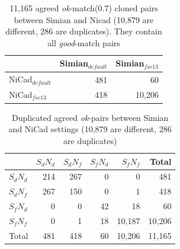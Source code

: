 \documentclass{IEEEtran}
\begin{document}
\begin{table}[H]
	\centering
	\caption{11,165 agreed \textit{ok}-match(0.7) cloned pairs between Simian and Nicad (10,879 are different, 286 are duplicates). They contain all \textit{good}-match pairs}
	\label{t_agreed_ok_clone_pairs}
	\begin{tabular}{l|r|r}
		\hline
		& Simian$_{\mathrm{\textit{default}}}$ & Simian$_{\mathrm{\textit{fse13}}}$ \\ %
		\hline
		NiCad$_{\mathrm{\textit{default}}}$ & 481 & 60 \\%
		NiCad$_{\mathrm{\textit{fse13}}}$   & 418 & 10,206 \\ %
		\hline
	\end{tabular}
\end{table}

\begin{table}[H]
	\centering
	\caption{Duplicated agreed \textit{ok}-pairs between Simian and NiCad settings (10,879 are different, 286 are duplicates)}
	\label{t_dup_agreed_ok_clone_pairs}
	\begin{tabular}{l|r|r|r|r|r}
		\hline
		& $S_dN_d$ & $S_dN_f$ & $S_fN_d$ & $S_fN_f$ & Total \\ %
		\hline
		$S_dN_d$ & 214 	& 267 	& 0		& 0 		& 481 \\
		$S_dN_f$ & 267 	& 150 	& 0 	& 1 		& 418 \\ 
		$S_fN_d$ & 0 	& 0 	& 42 	& 18  		& 60 \\
		$S_fN_f$ & 0 	& 1 	& 18 	& 10,187 	& 10,206 \\	
		\hline
		Total 	 & 481  & 418	& 60	& 10,206	& 11,165 \\
		\hline
	\end{tabular}
\end{table}
\end{document}
